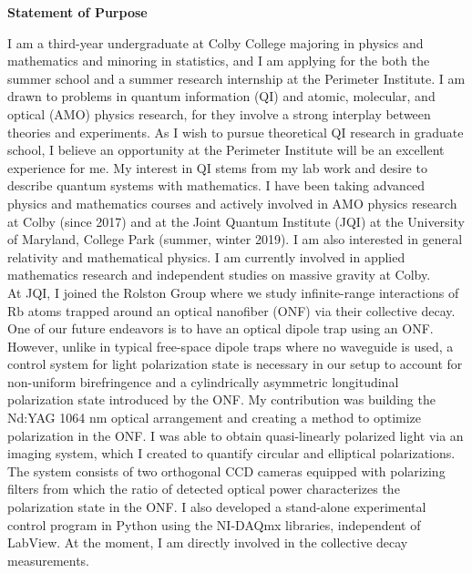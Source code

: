 \documentclass[10pt]{article}
\begin{document}
	
	
\begin{center}
	\textbf{Statement of Purpose}
\end{center}
	

\noindent I am a third-year undergraduate at Colby College majoring in physics and mathematics and minoring in statistics, and I am applying for the both the summer school and a summer research internship at the Perimeter Institute. I am drawn to problems in quantum information (QI) and atomic, molecular, and optical (AMO) physics research, for they involve a strong interplay between theories and experiments. As I wish to pursue theoretical QI research in graduate school, I believe an opportunity at the Perimeter Institute will be an excellent experience for me. My interest in QI stems from my lab work and desire to describe quantum systems with mathematics. I have been taking advanced physics and mathematics courses and actively involved in AMO physics research at Colby (since 2017) and at the Joint Quantum Institute (JQI) at the University of Maryland, College Park (summer, winter 2019). I am also interested in general relativity and mathematical physics. I am currently involved in applied mathematics research and independent studies on massive gravity at Colby.   \\


At JQI, I joined the Rolston Group where we study infinite-range interactions of Rb atoms trapped around an optical nanofiber (ONF) via their collective decay. One of our future endeavors is to have an optical dipole trap using an ONF. However, unlike in typical free-space dipole traps where no waveguide is used, a control system for light polarization state is necessary in our setup to account for non-uniform birefringence and a cylindrically asymmetric longitudinal polarization state introduced by the ONF. My contribution was building the Nd:YAG 1064 nm optical arrangement and creating a method to optimize polarization in the ONF. I was able to obtain quasi-linearly polarized light via an imaging system, which I created to quantify circular and elliptical polarizations. The system consists of two orthogonal CCD cameras equipped with polarizing filters from which the ratio of detected optical power characterizes the polarization state in the ONF. I also developed a stand-alone experimental control program in Python using the NI-DAQmx libraries, independent of LabView. At the moment, I am directly involved in the collective decay measurements. \\ 
\end{document}
